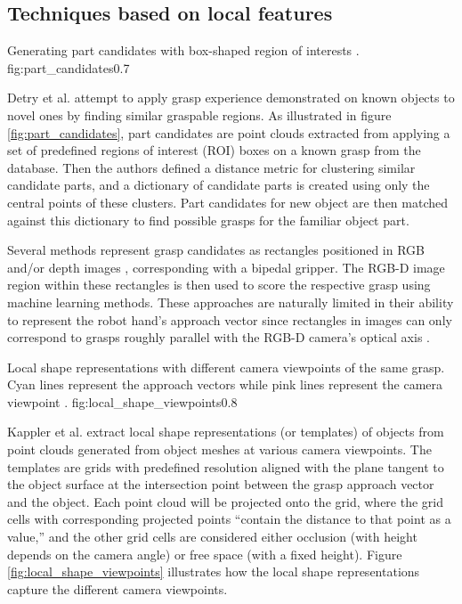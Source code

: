 \subsection{Techniques based on local features} \label{subsub:object_grasp_local}

             {Generating part candidates with box-shaped region of interests \cite{Detry2012}.}
             {fig:part_candidates}{0.7\textwidth}

Detry et al. \cite{Detry2012} attempt to apply grasp experience demonstrated on known objects to novel ones by finding
similar graspable regions. As illustrated in figure \ref{fig:part_candidates}, part candidates are point clouds
extracted from applying a set of predefined regions of interest (ROI) boxes on a known grasp from the database. Then the
authors defined a distance metric for clustering similar candidate parts, and a dictionary of candidate parts is created
using only the central points of these clusters. Part candidates for new object are then matched against this dictionary
to find possible grasps for the familiar object part.

Several methods represent grasp candidates as rectangles positioned in RGB and/or depth images
\cite{lenz2015,jiang2011}, corresponding with a bipedal gripper. The RGB-D image region within these rectangles is then
used to score the respective grasp using machine learning methods. These approaches are naturally limited in their
ability to represent the robot hand's approach vector since rectangles in images can only correspond to grasps roughly
parallel with the RGB-D camera's optical axis \cite{Gualtieri2016}.

             {Local shape representations with different camera viewpoints of the same grasp. Cyan lines represent the
              approach vectors while pink lines represent the camera viewpoint \cite{Kappler2015}.}
             {fig:local_shape_viewpoints}{0.8\textwidth}

Kappler et al. \cite{Kappler2015} extract local shape representations (or templates) of objects from point clouds
generated from object meshes at various camera viewpoints. The templates are grids with predefined resolution
aligned with the plane tangent to the object surface at the intersection point between the grasp approach vector and the
object. Each point cloud will be projected onto the grid, where the grid cells with corresponding projected points
``contain the distance to that point as a value,'' and the other grid cells are considered either occlusion
(with height depends on the camera angle) or free space (with a fixed height). Figure \ref{fig:local_shape_viewpoints}
illustrates how the local shape representations capture the different camera viewpoints.

